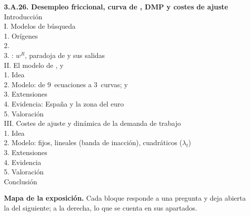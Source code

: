 \documentclass[11pt]{article}
\begin{document}
\begin{esquema}
\textbf{3.A.26. Desempleo friccional, curva de , DMP y costes de ajuste}\\[2pt]
Introducción\\
I. Modelos de búsqueda\\
\hspace*{1.5em}1. Orígenes\\
\hspace*{1.5em}2. \\
\hspace*{1.5em}3. : $w^R$, paradoja de  y sus salidas\\
II. El modelo de ,  y \\
\hspace*{1.5em}1. Idea\\
\hspace*{1.5em}2. Modelo: de 9~ecuaciones a 3~curvas;  y \\
\hspace*{1.5em}3. Extensiones\\
\hspace*{1.5em}4. Evidencia: España y la zona del euro\\
\hspace*{1.5em}5. Valoración\\
III. Costes de ajuste y dinámica de la demanda de trabajo\\
\hspace*{1.5em}1. Idea\\
\hspace*{1.5em}2. Modelo: fijos, lineales (banda de inacción), cuadráticos ($\lambda_t$)\\
\hspace*{1.5em}3. Extensiones\\
\hspace*{1.5em}4. Evidencia\\
\hspace*{1.5em}5. Valoración\\
Conclusión
\end{esquema}

\begin{anotaciones}
\textbf{Mapa de la exposición.} Cada bloque responde a una pregunta y deja abierta la del siguiente; a la derecha, lo que se cuenta en sus apartados.
\begin{infografiacaja}
\caption{Mapa de la exposición: la pregunta de cada bloque y el hilo que los une}\label{figu:mapa-tema}
\end{infografiacaja}
\end{anotaciones}
\end{document}
